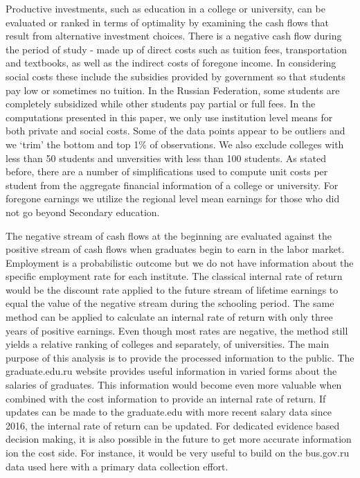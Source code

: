 \documentclass[alpha-refs]{wiley-article-05g}
\begin{document}
Productive investments, such as education in a college or university, can be evaluated or ranked in terms of optimality by examining the cash flows that result from alternative investment choices. There is a negative cash flow during the period of study - made up of direct costs such as tuition fees, transportation and textbooks, as well as the indirect costs of foregone income. In considering social costs these include the subsidies provided by government so that students pay low or sometimes no tuition. In the Russian Federation, some students are completely subsidized while other students pay partial or full fees. In the computations presented in this paper, we only use institution level means for both private and social costs. Some of the data points appear to be outliers and we `trim' the bottom and top 1\% of observations. We also exclude colleges with less than 50 students and unversities with less than 100 students. As stated before, there are a number of simplifications used to compute unit costs per student from the aggregate financial information of a college or university. For foregone earnings we utilize the regional level mean earnings for those who did not go beyond Secondary education. 

The negative stream of cash flows at the beginning are evaluated against the positive stream of cash flows when graduates begin to earn in the labor market. Employment is a probabilistic outcome but we do not have information about the specific employment rate for each institute. The classical internal rate of return would be the discount rate applied to the future stream of lifetime earnings to equal the value of the negative stream during the schooling period. The same method can be applied to calculate an internal rate of return with only three years of positive earnings. Even though most rates are negative, the method still yields a relative ranking of colleges and separately, of universities. The main purpose of this analysis is to provide the processed information to the public. The graduate.edu.ru website provides useful information in varied forms about the salaries of graduates. This information would become even more valuable when combined with the cost information to provide an internal rate of return. If updates can be made to the graduate.edu with more recent salary data since 2016, the internal rate of return can be updated. For dedicated evidence based decision making, it is also possible in the future to get more accurate information ion the cost side. For instance, it would be very useful to build on the bus.gov.ru data used here with a primary data collection effort. 
\end{document}
